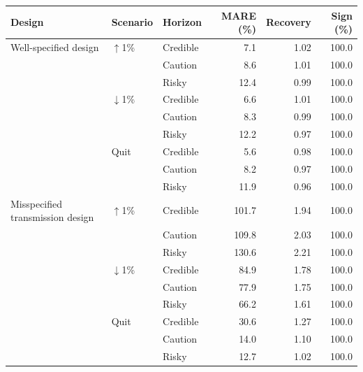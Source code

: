 \begingroup
\renewcommand{\arraystretch}{1.08}
\setlength{\tabcolsep}{4pt}
\begin{tabular}{lllrrr}
\toprule
Design & Scenario & Horizon & MARE (\%) & Recovery & Sign (\%) \\
\midrule
Well-specified design & $\uparrow$1\% & Credible & 7.1 & 1.02 & 100.0 \\
 &  & Caution & 8.6 & 1.01 & 100.0 \\
 &  & Risky & 12.4 & 0.99 & 100.0 \\
 & $\downarrow$1\% & Credible & 6.6 & 1.01 & 100.0 \\
 &  & Caution & 8.3 & 0.99 & 100.0 \\
 &  & Risky & 12.2 & 0.97 & 100.0 \\
 & Quit & Credible & 5.6 & 0.98 & 100.0 \\
 &  & Caution & 8.2 & 0.97 & 100.0 \\
 &  & Risky & 11.9 & 0.96 & 100.0 \\
\midrule
Misspecified transmission design & $\uparrow$1\% & Credible & 101.7 & 1.94 & 100.0 \\
 &  & Caution & 109.8 & 2.03 & 100.0 \\
 &  & Risky & 130.6 & 2.21 & 100.0 \\
 & $\downarrow$1\% & Credible & 84.9 & 1.78 & 100.0 \\
 &  & Caution & 77.9 & 1.75 & 100.0 \\
 &  & Risky & 66.2 & 1.61 & 100.0 \\
 & Quit & Credible & 30.6 & 1.27 & 100.0 \\
 &  & Caution & 14.0 & 1.10 & 100.0 \\
 &  & Risky & 12.7 & 1.02 & 100.0 \\
\bottomrule
\end{tabular}
\endgroup
